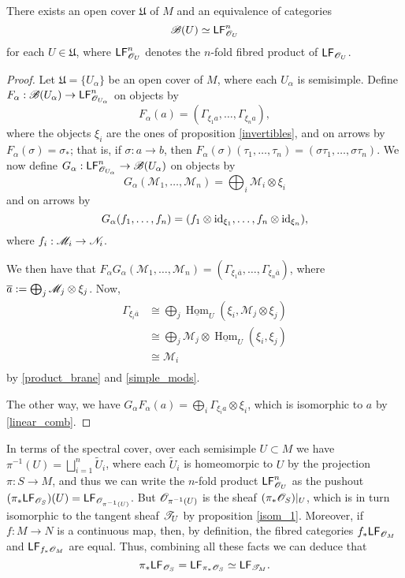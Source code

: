 \begin{theorem}\label{equivalences}
There exists an open cover $\mathfrak{U}$ of $M$ and an equivalence of categories
\begin{equation}\label{equiv_2vb}
\mathscr{B}(U)\simeq \mathsf{LF}^n_{\mathscr{O}_U}
\end{equation}
for each $U\in \mathfrak{U}$, where $\mathsf{LF}^n_{\mathscr{O}_U}$ denotes the $n$-fold fibred product of $\mathsf{LF}_{\mathscr{O}_U}$.
\end{theorem}
\begin{proof}
Let $\mathfrak{U}=\{U_\alpha \}$ be an open cover of $M$, where each $U_\alpha$ is semisimple. Define $F_\alpha:\mathscr{B}(U_\alpha )\rightarrow \mathsf{LF}^n_{\mathscr{O}_{U_\alpha}}$ on objects by
$$F_\alpha (a)=(\Gamma_{\xi_1a},\dots ,\Gamma_{\xi_na}),$$
where the objects $\xi_i$ are the ones of proposition \ref{invertibles}, and on arrows by $F_\alpha (\sigma )=\sigma_*$; that is, if $\sigma :a\to b$, then $F_\alpha (\sigma )(\tau_1,\dots ,\tau_n)=(\sigma \tau_1,\dots ,\sigma \tau_n)$. We now define $G_\alpha:\mathsf{LF}^n_{\mathscr{O}_{U_\alpha}}\rightarrow\mathscr{B}(U_\alpha )$ on objects by
$$G_\alpha (\mathscr{M}_1,\dots ,\mathscr{M}_n)=\bigoplus_i \mathscr{M}_i\otimes \xi_i$$
and on arrows by
$$G_\alpha (f_1,\dots ,f_n)=(f_1\otimes \operatorname{id}_{\xi_1},\dots ,f_n\otimes \operatorname{id}_{\xi_n}),$$
where $f_i:\mathscr{M}_i\to \mathscr{N}_i$.

We then have that $F_\alpha G_\alpha (\mathscr{M}_1,\dots ,\mathscr{M}_n)=(\Gamma_{\xi_1\overline{a}},\dots ,\Gamma_{\xi_n\overline{a}})$, where $\overline{a}:=\bigoplus_j\mathscr{M}_j\otimes \xi_j$. Now,
$$
\begin{aligned}
\Gamma_{\xi_i\overline{a}} &\cong \bigoplus_j \underline{\operatorname{Hom}}_U(\xi_i,\mathscr{M}_j\otimes \xi_j) \\
                    &\cong \bigoplus_j \mathscr{M}_j\otimes \underline{\operatorname{Hom}}_U(\xi_i,\xi_j) \\
                    &\cong \mathscr{M}_i \\
\end{aligned}
$$
by \eqref{product_brane} and \ref{simple_mods}.

The other way, we have $G_\alpha F_\alpha (a)=\bigoplus_i\Gamma_{\xi_ia}\otimes \xi_i$, which is isomorphic to $a$ by \ref{linear_comb}.
\end{proof}

In terms of the spectral cover, over each semisimple $U\subset M$ we have $\pi^{-1}(U)=\bigsqcup_{i=1}^n\widetilde{U}_i$, where each $\widetilde{U}_i$ is homeomorpic to $U$ by the projection $\pi :S\to M$, and thus we can write the $n$-fold product $\mathsf{LF}^n_{\mathscr{O}_U}$ as the pushout $(\pi_*\mathsf{LF}_{\mathscr{O}_S})(U)=\mathsf{LF}_{\mathscr{O}_{\pi^{-1}(U)}}$. But $\mathscr{O}_{\pi^{-1}(U)}$ is the sheaf $(\pi_*\mathscr{O}_S)|_U$, which is in turn isomorphic to the tangent sheaf $\mathscr{T}_U$ by proposition \ref{isom_1}. Moreover, if $f:M\to N$ is a continuous map, then, by definition, the fibred categories $f_*\mathsf{LF}_{\mathscr{O}_M}$ and $\mathsf{LF}_{f_*\mathscr{O}_M}$ are equal. Thus, combining all these facts we can deduce that
$$\pi_*\mathsf{LF}_{\mathscr{O}_S}=\mathsf{LF}_{\pi_*\mathscr{O}_S}\simeq \mathsf{LF}_{\mathscr{T}_M}.$$

